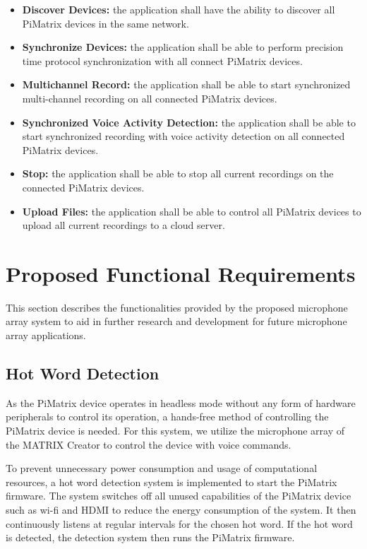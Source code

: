 \documentclass[hidelinks,12pt]{report} %
\begin{document}
	\begin{itemize}
		\item{\textbf{Discover Devices: }}
		the application shall have the ability to discover all PiMatrix devices in the same network.
	
		\item{\textbf{Synchronize Devices: }}
		the application shall be able to perform precision time protocol synchronization with all connect PiMatrix devices.

		\item{\textbf{Multichannel Record: }}
		the application shall be able to start synchronized multi-channel recording on all connected PiMatrix devices.

		\item{\textbf{Synchronized Voice Activity Detection: }}
		the application shall be able to start synchronized recording with voice activity detection on all connected PiMatrix devices.

		\item{\textbf{Stop: }}
		the application shall be able to stop all current recordings on the connected PiMatrix devices.

		\item{\textbf{Upload Files: }}
		the application shall be able to control all PiMatrix devices to upload all current recordings to a cloud server.
	
		
	\end{itemize}

\section{Proposed Functional Requirements}

This section describes the functionalities provided by the proposed microphone array system to aid in further research and development for future microphone array applications. 

\subsection{Hot Word Detection}

As the PiMatrix device operates in headless mode without any form of hardware peripherals to control its operation, a hands-free method of controlling the PiMatrix device is needed. For this system, we utilize the microphone array of the MATRIX Creator to control the device with voice commands.

To prevent unnecessary power consumption and usage of computational resources\cite{18}, a hot word detection system is implemented to start the PiMatrix firmware. The system switches off all unused capabilities of the PiMatrix device such as wi-fi and HDMI to reduce the energy consumption of the system. It then continuously listens at regular intervals for the chosen hot word. If the hot word is detected, the detection system then runs the PiMatrix firmware.
\end{document}
